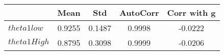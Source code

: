 \begin{tiny}\begin{tabular}{|l|c|c|c|c|}
\hline
&\textbf{Mean}&\textbf{Std}&\textbf{AutoCorr}&\textbf{Corr with g}\\\hline
\textbf{$theta1low$}&0.9255&0.1487&0.9998&-0.0222\\\hline
\textbf{$theta1High$}&0.8795&0.3098&0.9999&-0.0206\\\hline
\end{tabular}
\end{tiny}
